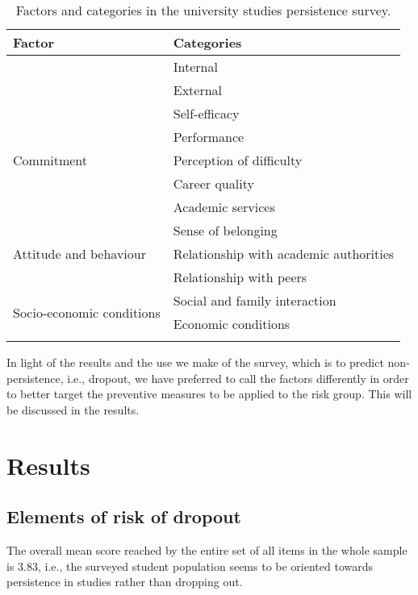 \documentclass[english]{textolivre}
\begin{document}
\begin{table}[h!]
\centering
\begin{threeparttable}
\caption{Factors and categories in the university studies persistence survey.}
\label{tab01}
\begin{tabular}{l l}
\toprule
Factor & Categories \\
\midrule
\arrayrulecolor[gray]{.7}
\multirow{2}{*}{Motivation} & Internal  \\
& External \\
\midrule
\multirow{5}{*}{Commitment} & Self-efficacy \\
& Performance \\
& Perception of difficulty \\
& Career quality \\
& Academic services \\
\midrule
\multirow{3}{*}{Attitude and behaviour} & Sense of belonging \\
& Relationship with academic authorities \\
& Relationship with peers \\
\midrule
\multirow{2}{*}{Socio-economic conditions} & Social and family interaction \\
& Economic conditions \\
\arrayrulecolor{black}
\bottomrule
\end{tabular}
\end{threeparttable}
\end{table}

In light of the results and the use we make of the survey, which is to predict non-persistence, i.e., dropout, we have preferred to call the factors differently in order to better target the preventive measures to be applied to the risk group. This will be discussed in the results.

\section{Results}\label{sec-organizacao-latex}
\subsection{Elements of risk of dropout}
The overall mean score reached by the entire set of all items in the whole sample is 3.83, i.e., the surveyed student population seems to be oriented towards persistence in studies rather than dropping out. 
\end{document}
